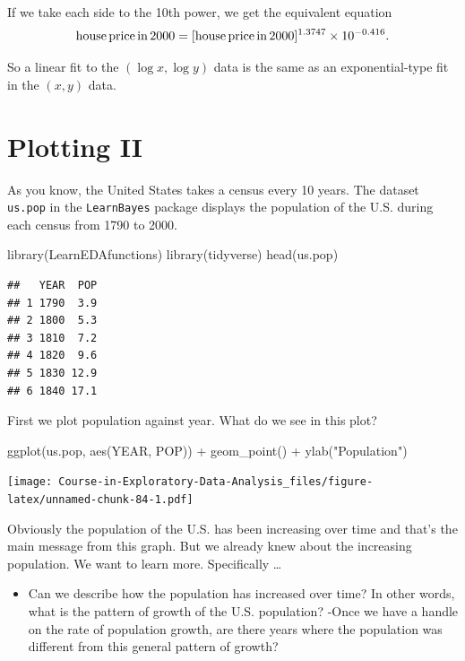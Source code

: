 \documentclass[
]{book}
\newenvironment{Shaded}{\begin{snugshade}}{\end{snugshade}}
\newcommand{\FunctionTok}[1]{\textcolor[rgb]{0.00,0.00,0.00}{#1}}
\newcommand{\NormalTok}[1]{#1}
\newcommand{\SpecialCharTok}[1]{\textcolor[rgb]{0.00,0.00,0.00}{#1}}
\newcommand{\StringTok}[1]{\textcolor[rgb]{0.31,0.60,0.02}{#1}}
\providecommand{\tightlist}{%
  \setlength{\itemsep}{0pt}\setlength{\parskip}{0pt}}
\begin{document}
If we take each side to the 10th power, we get the equivalent equation
\[  
{\rm house \, price \, in \, 2000} = [{\rm house \, price \, in \, 2000}]^{1.3747} \times 10^{- 0.416}.
\]

So a linear fit to the \((\log x, \log y)\) data is the same as an exponential-type fit in the \((x, y)\) data.

\hypertarget{plotting-ii}{%
\chapter{Plotting II}\label{plotting-ii}}

As you know, the United States takes a census every 10 years. The dataset \texttt{us.pop} in the \texttt{LearnBayes} package displays the population of the U.S. during each census from 1790 to 2000.

\begin{Shaded}
\begin{Highlighting}[]
\FunctionTok{library}\NormalTok{(LearnEDAfunctions)}
\FunctionTok{library}\NormalTok{(tidyverse)}
\FunctionTok{head}\NormalTok{(us.pop)}
\end{Highlighting}
\end{Shaded}

\begin{verbatim}
##   YEAR  POP
## 1 1790  3.9
## 2 1800  5.3
## 3 1810  7.2
## 4 1820  9.6
## 5 1830 12.9
## 6 1840 17.1
\end{verbatim}

First we plot population against year. What do we see in this plot?

\begin{Shaded}
\begin{Highlighting}[]
\FunctionTok{ggplot}\NormalTok{(us.pop, }\FunctionTok{aes}\NormalTok{(YEAR, POP)) }\SpecialCharTok{+} 
  \FunctionTok{geom\_point}\NormalTok{() }\SpecialCharTok{+}
  \FunctionTok{ylab}\NormalTok{(}\StringTok{"Population"}\NormalTok{)}
\end{Highlighting}
\end{Shaded}

\texttt{[image: Course-in-Exploratory-Data-Analysis\_files/figure-latex/unnamed-chunk-84-1.pdf]}

Obviously the population of the U.S. has been increasing over time and that's the main message from this graph. But we already knew about the increasing population. We want to learn more. Specifically \ldots{}

\begin{itemize}
\tightlist
\item
  Can we describe how the population has increased over time? In other words, what is the pattern of growth of the U.S. population?
  -Once we have a handle on the rate of population growth, are there years where the population was different from this general pattern of growth?
\end{itemize}
\end{document}
